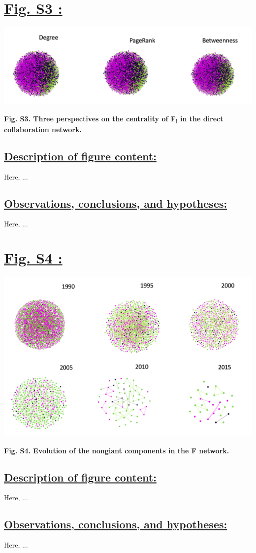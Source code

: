 \documentclass{article}\usepackage[]{graphicx}\usepackage[]{color}
\begin{document}
\newpage
\section*{\underline{Fig. S3 :}}
\begin{center}
\includegraphics[scale=0.7]{S3.png}
\newline
\par{\textbf{Fig. S3. Three perspectives on the centrality of F\textsubscript{i} in the direct collaboration network.}}
\end{center}
\subsection*{\underline{Description of figure content:}}
\par{Here, ...}
\subsection*{\underline{Observations, conclusions, and hypotheses:}}
\par{Here, ...}

\newpage
\section*{\underline{Fig. S4 :}}
\begin{center}
\includegraphics[scale=0.6]{S4.png}
\newline
\par{\textbf{Fig. S4. Evolution of the nongiant components in the F network.}}
\end{center}
\subsection*{\underline{Description of figure content:}}
\par{Here, ...}
\subsection*{\underline{Observations, conclusions, and hypotheses:}}
\par{Here, ...}
\end{document}
